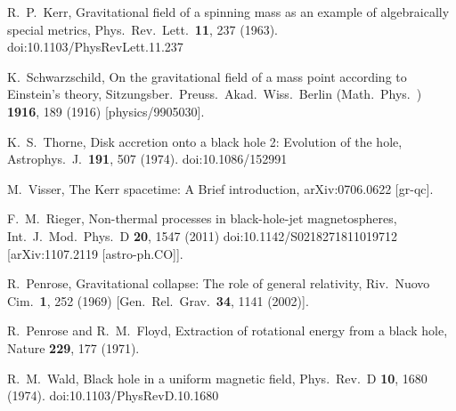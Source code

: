 \documentclass[aps,prd,twocolumn,superscriptaddress,tightenlines,nofootinbib]{revtex4-1}
\begin{document}
\begin{thebibliography}{99}



  R.~P.~Kerr,
    {\color{rossoCP3}  Gravitational field of a spinning mass as an example of algebraically special metrics},
  Phys.\ Rev.\ Lett.\  {\bf 11}, 237 (1963).
  doi:10.1103/PhysRevLett.11.237


  K.~Schwarzschild,
  {\color{rossoCP3}  On the gravitational field of a mass point according to Einstein's theory},
  Sitzungsber.\ Preuss.\ Akad.\ Wiss.\ Berlin (Math.\ Phys.\ ) {\bf 1916}, 189 (1916)
  [physics/9905030].



  K.~S.~Thorne,
{\color{rossoCP3}  Disk accretion onto a black hole 2: Evolution of the hole},
  Astrophys.\ J.\  {\bf 191}, 507 (1974).
  doi:10.1086/152991



  M.~Visser,
     {\color{rossoCP3} The Kerr spacetime: A Brief introduction},
  arXiv:0706.0622 [gr-qc].


  F.~M.~Rieger,
    {\color{rossoCP3} Non-thermal processes in black-hole-jet magnetospheres},
  Int.\ J.\ Mod.\ Phys.\ D {\bf 20}, 1547 (2011)
  doi:10.1142/S0218271811019712
  [arXiv:1107.2119 [astro-ph.CO]].


  R.~Penrose,
    {\color{rossoCP3} Gravitational collapse: The role of general relativity},
  Riv.\ Nuovo Cim.\  {\bf 1}, 252 (1969)
  [Gen.\ Rel.\ Grav.\  {\bf 34}, 1141 (2002)].

  R.~Penrose and R.~M.~Floyd,
  {\color{rossoCP3}   Extraction of rotational energy from a black hole},
  Nature {\bf 229}, 177 (1971).


  R.~M.~Wald,
   {\color{rossoCP3} Black hole in a uniform magnetic field},
  Phys.\ Rev.\ D {\bf 10}, 1680 (1974).
  doi:10.1103/PhysRevD.10.1680






\end{thebibliography}
\end{document}
